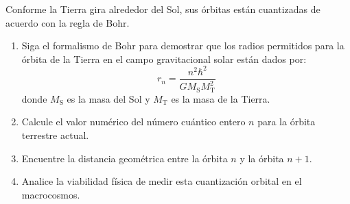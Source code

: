 \item Conforme la Tierra gira alrededor del Sol, sus órbitas están cuantizadas de acuerdo con la regla de Bohr.
\begin{enumerate}
    \item Siga el formalismo de Bohr para demostrar que los radios permitidos para la órbita de la Tierra en el campo gravitacional solar están dados por:
    $$ r_n = \frac{n^2 \hbar^2}{G M_{\text{S}} M_{\text{T}}^2} $$
    donde $M_{\text{S}}$ es la masa del Sol y $M_{\text{T}}$ es la masa de la Tierra.
    \item Calcule el valor numérico del número cuántico entero $n$ para la órbita terrestre actual.
    \item Encuentre la distancia geométrica entre la órbita $n$ y la órbita $n + 1$.
    \item Analice la viabilidad física de medir esta cuantización orbital en el macrocosmos.
\end{enumerate}